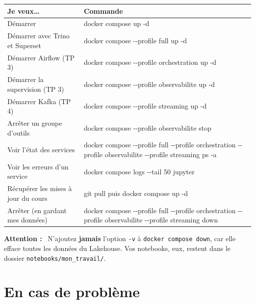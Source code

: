 \documentclass[11pt,a4paper]{article}
\newenvironment{attention}{\par\medskip\noindent\textbf{\textcolor{lhred}{Attention :}}\ }{\par\medskip}
\newcommand{\cmd}[1]{\texttt{#1}}
\begin{document}
\begin{center}
\renewcommand{\arraystretch}{1.25}
\begin{tabularx}{\textwidth}{@{}l >{\ttfamily}X@{}}
\toprule
\textbf{Je veux\dots} & \textbf{\normalfont Commande} \\
\midrule
Démarrer                           & docker compose up -d \\
Démarrer avec Trino et Superset    & docker compose -{}-profile full up -d \\
Démarrer Airflow (TP 3)            & docker compose -{}-profile orchestration up -d \\
Démarrer la supervision (TP 3)     & docker compose -{}-profile observabilite up -d \\
Démarrer Kafka (TP 4)              & docker compose -{}-profile streaming up -d \\
Arrêter un groupe d'outils         & docker compose -{}-profile observabilite stop \\
Voir l'état des services           & docker compose -{}-profile full -{}-profile orchestration -{}-profile observabilite -{}-profile streaming ps -a \\
Voir les erreurs d'un service      & docker compose logs -{}-tail 50 jupyter \\
Récupérer les mises à jour du cours & git pull \quad \textrm{puis} \quad docker compose up -d \\
Arrêter (en gardant mes données)   & docker compose -{}-profile full -{}-profile orchestration -{}-profile observabilite -{}-profile streaming down \\
\bottomrule
\end{tabularx}
\end{center}

\begin{attention}
N'ajoutez \textbf{jamais} l'option \cmd{-v} à \cmd{docker compose down}, car elle efface toutes les
données du Lakehouse. Vos notebooks, eux, restent dans le dossier \texttt{notebooks/mon\_travail/}.
\end{attention}

\section{En cas de problème}
\end{document}
